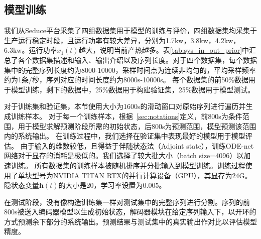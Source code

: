 
\subsection{模型训练}
\label{sec:model_training}

我们从Seduce平台采集了四组数据集用于模型的训练与评价，四组数据集均采集于生产运行稳定时段，且运行功率有较大差异，分别为1.7kw，3.8kw，4.2kw，6.3kw。运行功率$x_1(t)$越大，说明当前产热越多。表\ref{tab:sys_in_out_prior}中汇总了各个数据集描述和输入、输出介绍以及序列长度。对于四个数据集，每个数据集中的完整序列长度约为8000-10000，采样时间点为连续非均匀的，平均采样频率约为1条/秒，序列对应的时间长度约为8000s-10000s。
每个数据集的前50\%数据用于模型训练，剩下的数据中，25\%数据用于构建验证集，25\%数据用于模型测试。

对于训练集和验证集，本节使用大小为1600s的滑动窗口对原始序列进行遍历并生成训练样本。
对于每一个训练样本，根据~\ref{sec:notations}定义，前800s为条件范围，用于模型求解预测阶段所需的初始状态，后800s为预测范围，模型预测该范围内的系统输出。
在训练过程中，我们选择在验证集中表现最好的模型用于模型评估。
由于输入的维数较低，且得益于伴随状态法（Adjoint state），训练ODE-net网络对于显存的消耗是极低的。我们选择了较大批大小（batch size=4096）以加速训练。
所有数据集的训练样本被随机排序并分批输入到模型训练。训练过程使用了单块型号为NVIDIA TITAN RTX的并行计算设备（GPU），其显存为24G。
隐状态变量$\boldsymbol h(t)$的大小是20，学习率设置为0.005。

在测试阶段，没有像构造训练集一样对测试集中的完整序列进行分割。序列的前800s被送入编码器模型以生成初始状态，解码器模块在给定序列输入下，以开环的方式预测余下部分的系统输出。预测结果与测试集中的真实输出作对比以评估模型精度。


